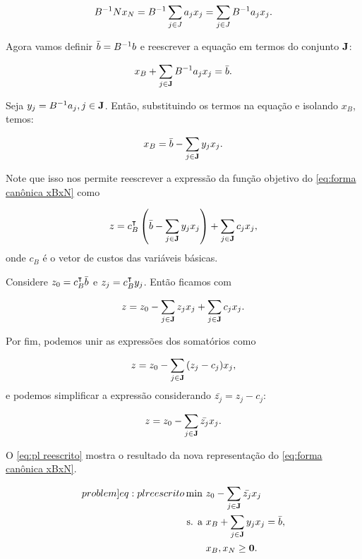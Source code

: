 \begin{equation}
    B^{-1} N  x_N = B^{-1}\sum_{j\in J}{ a_j x_j} = \sum_{j\in J}{B^{-1} a_j x_j}.
\end{equation}

Agora vamos definir $\bar{b} = B^{-1}b$ e reescrever a equação em termos do conjunto $ \vb J$:

\begin{equation}
      x_B + \sum_{j\in \vb J}{B^{-1} a_j x_j} = \bar{b}.
\end{equation}

Seja $y_j = B^{-1}a_j, j \in \vb J$. Então, substituindo os termos na equação e isolando $  x_B$, temos:

\begin{equation}
      x_B = \bar{b} - \sum_{j\in \vb J}{y_j x_j}.
\end{equation}

Note que isso nos permite reescrever a expressão da função objetivo do \cref{eq:forma canônica xBxN} como

\begin{equation}
    z =  c_B^\intercal\left(\bar{b} - \sum_{j\in \vb J}{y_j x_j}\right) + \sum_{j\in \vb J} c_j x_j,
\end{equation}
onde $ c_B$ é o vetor de custos das variáveis básicas.

Considere $z_0 =  c_B^\intercal\bar{b}$ e $ z_j =  c_B^\intercal y_j$. Então ficamos com

\begin{equation}
    z = z_0 - \sum_{j\in \vb J}{ z_j x_j} + \sum_{j\in \vb J} c_j x_j.
\end{equation}

Por fim, podemos unir as expressões dos somatórios como

\begin{equation}
    z = z_0 - \sum_{j\in \vb J}{(z_j - c_j)} x_j,
\end{equation}
e podemos simplificar a expressão considerando $\bar{ z_j} = z_j - c_j$:

\begin{equation}
    z = z_0 - \sum_{j\in \vb J}{\bar{ z_j}} x_j.
\end{equation}

O \cref{eq:pl reescrito} mostra o resultado da nova representação do \cref{eq:forma canônica xBxN}.

\begin{align}\label[problem]{eq:pl reescrito}
    \min\ &z_0 - \sum_{j\in \vb J}{\bar{ z_j}} x_j\\
    \text{s. a }&  x_B + \sum_{j\in \vb J}{ y_j x_j} = \vbbbar,\\
    &   x_B,   x_N \geq \vb 0.
\end{align}

